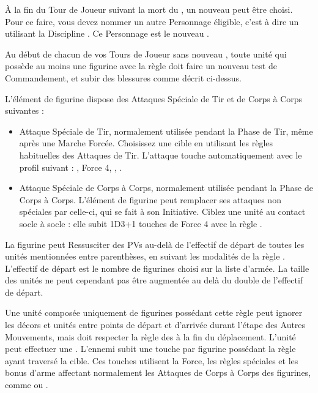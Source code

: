 À la fin du Tour de Joueur suivant la mort du \master{}, un nouveau \master{} peut être choisi. Pour ce faire, vous devez nommer un autre Personnage éligible, c'est à dire un \wizard{} utilisant la Discipline \necromancy{}. Ce Personnage est le nouveau \master{}.

Au début de chacun de vos Tours de Joueur sans nouveau \master{}, toute unité qui possède au moins une figurine avec la règle \ashestoashes{} doit faire un nouveau test de Commandement, et subir des blessures comme décrit ci-dessus.

\armyspecialruleentry{\wailofwoe}

L'élément de figurine dispose des Attaques Spéciale de Tir et de Corps à Corps suivantes :
\begin{itemize}[label={-}]
\item Attaque Spéciale de Tir, normalement utilisée pendant la Phase de Tir, même après une Marche Forcée. Choisissez une cible en utilisant les règles habituelles des Attaques de Tir. L'attaque touche automatiquement avec le profil suivant :\newline
{}, Force 4, \magicalattacks{}, .
\item Attaque Spéciale de Corps à Corps, normalement utilisée pendant la Phase de Corps à Corps. L'élément de figurine peut remplacer ses attaques non spéciales par celle-ci, qui se fait à son Initiative. Ciblez une unité au contact socle à socle : elle subit 1D3+1 touches de Force 4 avec la règle \magicalattacks{}.
\end{itemize}



La figurine peut Ressusciter des PVs au-delà de l'effectif de départ de toutes les unités mentionnées entre parenthèses, en suivant les modalités de la règle \raisewounds{}. L'effectif de départ est le nombre de figurines choisi sur la liste d'armée. La taille des unités ne peut cependant pas être augmentée au delà du double de l'effectif de départ.

\newpage
\armyspecialruleentry{\reaper}

Une unité composée uniquement de figurines possédant cette règle peut ignorer les décors et unités entre points de départ et d'arrivée durant l'étape des Autres Mouvements, mais doit respecter la règle des  à la fin du déplacement. L'unité peut effectuer une \sweepingattack{}. L'ennemi subit une touche par figurine possédant la règle \reaper{} ayant traversé la cible. Ces touches utilisent la Force, les règles spéciales et les bonus d'arme affectant normalement les Attaques de Corps à Corps des figurines, comme \flamingattacks{} ou \armourpiercing{}.

